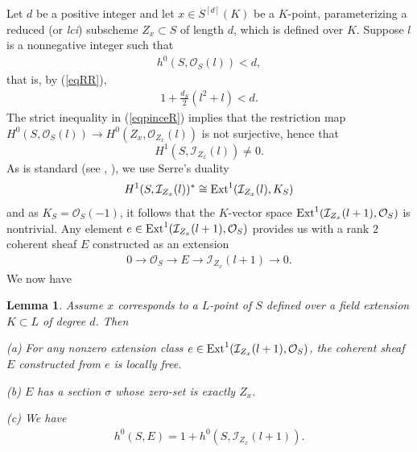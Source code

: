 \documentclass[10pt]{article}
\newtheorem{lemm}[theo]{Lemma}
\begin{document}
Let $d$ be a positive integer  and let  $x\in S^{[d]}(K)$ be a  $K$-point, parameterizing a reduced (or {\it lci}) subscheme $Z_{x}\subset S$ of length $d$, which is defined over $K$. Suppose $l$ is   a nonnegative  integer    such  that
\begin{eqnarray} \label{eqpinceR} h^0(S,\mathcal{O}_S(l))<d,
\end{eqnarray}
that is, by (\ref{eqRR}),
\begin{eqnarray} \label{eqpinceplusRR} 1+\frac{d_S}{2}(l^2+l)<d.
\end{eqnarray}
 The strict inequality  in (\ref{eqpinceR}) implies that  the restriction map
$H^0(S,\mathcal{O}_S(l))\rightarrow H^0(Z_x,\mathcal{O}_{Z_x}(l))$ is not surjective, hence that
$$H^1(S,\mathcal{I}_{Z_x}(l))\not=0.$$
 As is standard (see \cite{schwarzenberger}, \cite{lazarsfeld}), we  use Serre's duality
$$H^1(S,\mathcal{I}_{Z_x}(l))^*\cong {\rm Ext}^1(\mathcal{I}_{Z_x}(l),K_S)$$
and as $K_S=\mathcal{O}_S(-1)$, it follows that the $K$-vector space
${\rm Ext}^1(\mathcal{I}_{Z_x}(l+1),\mathcal{O}_S)$ is nontrivial.
Any element $e\in {\rm Ext}^1(\mathcal{I}_{Z_x}(l+1),\mathcal{O}_S)$ provides us with a rank $2$ coherent sheaf $E$  constructed
 as  an extension
\begin{eqnarray}\label{eqextvb} 0\rightarrow \mathcal{O}_S\rightarrow E\rightarrow \mathcal{I}_{Z_x}(l+1)\rightarrow 0.
\end{eqnarray}
We now have
\begin{lemm} \label{lepourvb} Assume $x$ corresponds to a $L$-point of $S$ defined over a field extension $K\subset L$ of degree $d$. Then

(a) For any nonzero  extension class $e\in {\rm Ext}^1(\mathcal{I}_{Z_x}(l+1),\mathcal{O}_S)$, the coherent sheaf $E$ constructed from $e$  is locally free.

(b) $E$ has a section $\sigma$ whose zero-set is exactly $Z_x$.

(c)  We have
\begin{eqnarray}\label{eqdimspsec} h^0(S,E)=1+h^0(S,\mathcal{I}_{Z_x}(l+1)).
\end{eqnarray}

\end{lemm}
\end{document}
